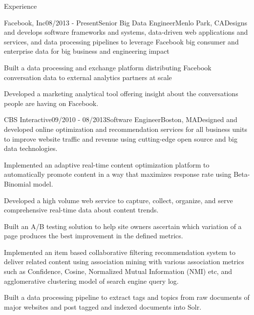 \documentclass{resume} %
\begin{document}

\begin{rSection}{Experience}

\begin{rSubsection}{Facebook, Inc}{08/2013 - Present}{Senior Big Data Engineer}{Menlo Park, CA}{Designs and develops software frameworks and systems, data-driven web applications and services, and data processing pipelines to leverage Facebook big consumer and enterprise data for big business and engineering impact}
\item Built a data processing and exchange platform distributing Facebook conversation data to external analytics partners at scale
\item Developed a marketing analytical tool offering insight about the conversations people are having on Facebook.
\end{rSubsection}


\begin{rSubsection}{CBS Interactive}{09/2010 - 08/2013}{Software Engineer}{Boston, MA}{Designed and developed online optimization and recommendation services for all business units to improve website traffic and revenue using cutting-edge open source and big data technologies.}
\item Implemented an adaptive real-time content optimization platform to automatically promote content in a way that maximizes response rate using Beta-Binomial model.
\item Developed a high volume web service to capture, collect, organize, and serve comprehensive real-time data about content trends.
\item Built an A/B testing solution to help site owners ascertain which variation of a page produces the best improvement in the defined metrics.
\item Implemented an item based collaborative filtering recommendation system to deliver related content using association mining with various association metrics such as Confidence, Cosine, Normalized Mutual Information (NMI) etc, and agglomerative clustering model of search engine query log.
\item Built a data processing pipeline to extract tags and topics from raw documents of major websites and post tagged and indexed documents into Solr.
\end{rSubsection}


\end{rSection}
\end{document}
